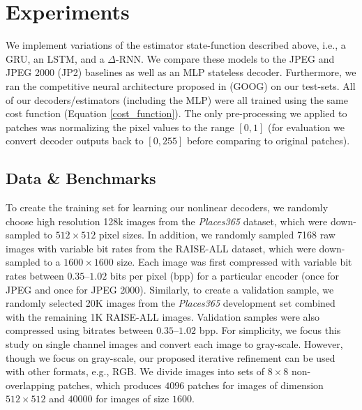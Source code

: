 \documentclass[smallabstract,smallcaptions]{dccpaper}
\begin{document}
\section{Experiments}
\label{experiments}
We implement variations of the estimator state-function described above, i.e., a GRU, an LSTM, and a $\Delta$-RNN.
We compare these models to the JPEG and JPEG 2000 (JP2) baselines as well as an MLP stateless decoder.  Furthermore, we ran the competitive neural architecture proposed in \cite{toderici2016full} (GOOG) on our test-sets. All of our decoders/estimators (including the MLP) were all trained using the same cost function (Equation \ref{cost_function}). The only pre-processing we applied to patches was normalizing the pixel values to the range $[0,1]$ (for evaluation we convert decoder outputs back to $[0,255]$ before comparing to original patches).

\subsection{Data \& Benchmarks}  
\label{exp:data}
To create the training set for learning our nonlinear decoders, we randomly choose high resolution 128k images from the \emph{Places365}{\cite{zhou2017places}} dataset, which were down-sampled to $512\times512$ pixel sizes. In addition, we randomly sampled 7168 raw images with variable bit rates from the RAISE-ALL{\cite{Raise}} dataset, which were down-sampled to a $1600\times1600$ size. Each image was first compressed with variable bit rates between $0.35$--$1.02$ bits per pixel (bpp) for a particular encoder (once for JPEG and once for JPEG 2000). Similarly, to create a validation sample, we randomly selected 20K images from the \emph{Places365} development set combined with the remaining 1K RAISE-ALL images. Validation samples were also compressed using bitrates between $0.35$--$1.02$ bpp. 
For simplicity, we focus this study on single channel images and convert each image to gray-scale. However, though we focus on gray-scale, our proposed iterative refinement can be used with other formats, e.g., RGB. We divide images into sets of $8\times8$ non-overlapping patches, which produces $4096$ patches for images of dimension $512\times512$ and $40000$ for images of size $1600$.
\end{document}
